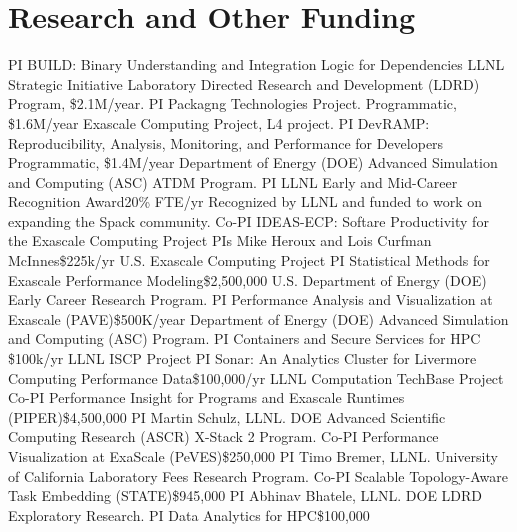 \section{Research and Other Funding}
		{PI}
		{BUILD: Binary Understanding and Integration Logic for Dependencies}
        {}{LLNL Strategic Initiative}
		{Laboratory Directed Research and Development (LDRD) Program, \$2.1M/year.}
		{PI}
		{Packagng Technologies Project.}
        {}{Programmatic, \$1.6M/year}
		{Exascale Computing Project, L4 project.}
		{PI}
		{DevRAMP: Reproducibility, Analysis, Monitoring, and Performance for Developers}
        {}{Programmatic, \$1.4M/year}
		{Department of Energy (DOE) Advanced Simulation and Computing (ASC) ATDM Program.}
		{PI}
		{LLNL Early and Mid-Career Recognition Award}{}{20\% FTE/yr}
		{Recognized by LLNL and funded to work on expanding the Spack community.}
		{Co-PI}
		{IDEAS-ECP: Softare Productivity for the Exascale Computing Project}
        {PIs Mike Heroux and Lois Curfman McInnes}{\$225k/yr}
		{U.S. Exascale Computing Project}
		{PI}
		{Statistical Methods for Exascale Performance Modeling}{}{\$2,500,000}
		{U.S. Department of Energy (DOE) Early Career Research Program.}
		{PI}
		{Performance Analysis and Visualization at Exascale (PAVE)}{}{\$500K/year}
		{%
		 Department of Energy (DOE) Advanced Simulation and Computing (ASC) Program.}
		{PI}
		{Containers and Secure Services for HPC}
        {}{\$100k/yr}
		{LLNL ISCP Project}
		{PI}
		{Sonar: An Analytics Cluster for Livermore Computing Performance Data}{}{\$100,000/yr}
		{LLNL Computation TechBase Project}
		{Co-PI}
		{Performance Insight for Programs and Exascale Runtimes (PIPER)}{}{\$4,500,000}
		{PI Martin Schulz, LLNL. DOE Advanced Scientific Computing Research (ASCR)
		 X-Stack 2 Program.}
		{Co-PI}
		{Performance Visualization at ExaScale (PeVES)}{}{\$250,000}
		{PI Timo Bremer, LLNL. University of California Laboratory Fees Research Program.}
		{Co-PI}
		{Scalable Topology-Aware Task Embedding (STATE)}{}{\$945,000}
		{PI Abhinav Bhatele, LLNL. DOE LDRD Exploratory Research.}
		{PI}
		{Data Analytics for HPC}{}{\$100,000}
		{}
